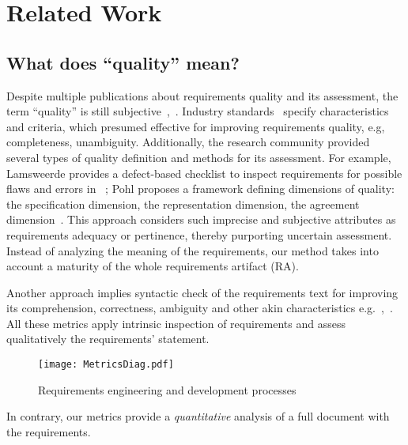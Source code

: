 \section{Related Work}
\label{sec:relatedwork} 

\subsection{What does ``quality'' mean?}

Despite multiple publications about requirements quality and its assessment, 
the term ``quality'' is still subjective~\cite{Mund:2017},~\cite{Femmer:2017}. 
Industry standards~\cite{ISO/IEC/IEEE:2011} specify characteristics and criteria, 
which presumed effective for improving requirements quality, e.g, completeness, unambiguity. 
Additionally, the research community provided several types of quality definition and methods for its assessment. 
For example, Lamsweerde provides a defect-based checklist to inspect requirements for possible flaws 
and errors in ~\cite{Lamsweerde:2009}; Pohl proposes a framework defining dimensions of quality: 
the specification dimension, the representation dimension, the agreement dimension~\cite{POHL:1994}.
This approach considers such imprecise and subjective attributes as requirements adequacy or pertinence, thereby purporting uncertain assessment.
Instead of analyzing the meaning of the requirements, our method takes into account a maturity of the whole requirements artifact (RA).


Another approach implies syntactic check of the requirements text for improving its comprehension, 
correctness, ambiguity and other akin characteristics e.g.~\cite{Ferrari:2014},~\cite{Berry:2006}.
All these metrics apply intrinsic inspection of requirements and assess qualitatively the requirements' statement. 

\begin{figure}[H]
	\centering
		\texttt{[image: MetricsDiag.pdf]}
	\caption{Requirements engineering and development processes}
	\label{fig:Metrics_shot}
\end{figure}

In contrary, our metrics provide a \textit{quantitative} analysis of a full document with the requirements.

